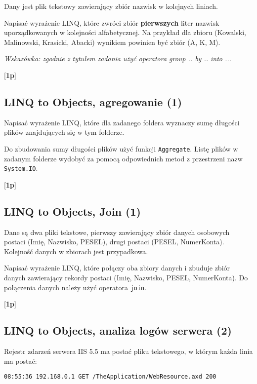   Dany jest plik tekstowy zawierający zbiór nazwisk w kolejnych liniach.

  Napisać wyrażenie LINQ, które zwróci zbiór {\bf pierwszych} liter nazwisk
\label{linq_grupowanie}  
  uporządkowanych w kolejności alfabetycznej. Na przykład dla zbioru
  (Kowalski, Malinowski, Krasicki, Abacki) wynikiem powinien być zbiór
  (A, K, M).
  
  {\em Wskazówka: zgodnie z tytułem zadania użyć operatora group .. by .. into ... }

  [{\bf 1p}]
 
\subsection{LINQ to Objects, agregowanie (1)}

  Napisać wyrażenie LINQ, które dla zadanego foldera wyznaczy sumę
\label{linq_agregowanie}  
  długości plików znajdujących się w tym folderze. 
  
  Do zbudowania sumy długości plików użyć funkcji {\tt Aggregate}. Listę
  plików w zadanym folderze wydobyć za pomocą odpowiednich metod
  z przestrzeni nazw {\tt System.IO}.

  [{\bf 1p}]

\subsection{LINQ to Objects, Join (1)}

  Dane są dwa pliki tekstowe, pierwszy zawierający zbiór danych osobowych postaci
\label{linq_join}  
  (Imię, Nazwisko, PESEL), drugi postaci (PESEL, NumerKonta). Kolejność
  danych w zbiorach jest przypadkowa.
  
  Napisać wyrażenie LINQ, które połączy oba zbiory danych i zbuduje zbiór
  danych zawierający rekordy postaci (Imię, Nazwisko, PESEL, NumerKonta).
  Do połączenia danych należy użyć operatora {\tt join}.
  
  [{\bf 1p}]  
  
\subsection{LINQ to Objects, analiza logów serwera (2)}

  Rejestr zdarzeń serwera IIS 5.5 ma postać pliku tekstowego, w którym każda
\label{linq_logi}  
  linia ma postać:
  
\begin{verbatim}
08:55:36 192.168.0.1 GET /TheApplication/WebResource.axd 200
\end{verbatim}


